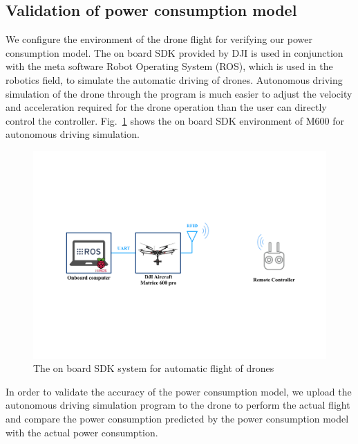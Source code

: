 \documentclass[journal]{./template/IEEEtran}
\begin{document}
\label{Section: Deep Neural networks (DNN)}





\subsection{Validation of power consumption model}

We configure the environment of the drone flight for verifying our power consumption model. 
The on board SDK provided by DJI is used in conjunction with the meta software Robot Operating System (ROS), which is used in the robotics field, to simulate the automatic driving of drones. 
Autonomous driving simulation of the drone through the program is much easier to adjust the velocity and acceleration required for the drone operation than the user can directly control the controller. 
Fig.~\ref{fig:SDK} shows the on board SDK environment of M600 for autonomous driving simulation.

\begin{figure}[htbp]
\centering\includegraphics[scale=0.36]{fig7/SDK.pdf}
\caption{The on board SDK system for automatic flight of drones}
\label{fig:SDK}
\end{figure}

In order to validate the accuracy of the power consumption model, we upload the autonomous driving simulation program to the drone to perform the actual flight and compare the power consumption predicted by the power consumption model with the actual power consumption. 
\end{document}
